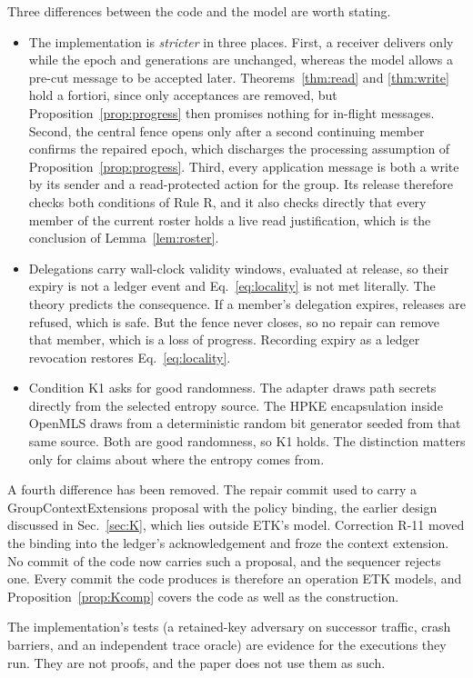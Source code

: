 \documentclass[aps,prx,reprint,superscriptaddress,nofootinbib,floatfix]{revtex4-2}
\theoremstyle{remark}
\begin{document}
Three differences between the code and the model are worth stating.
\begin{itemize}
\item The implementation is \emph{stricter} in three places. First, a receiver delivers only while the epoch and generations are unchanged, whereas the model allows a pre-cut message to be accepted later. Theorems~\ref{thm:read} and \ref{thm:write} hold a fortiori, since only acceptances are removed, but Proposition~\ref{prop:progress} then promises nothing for in-flight messages. Second, the central fence opens only after a second continuing member confirms the repaired epoch, which discharges the processing assumption of Proposition~\ref{prop:progress}. Third, every application message is both a write by its sender and a read-protected action for the group. Its release therefore checks both conditions of Rule R, and it also checks directly that every member of the current roster holds a live read justification, which is the conclusion of Lemma~\ref{lem:roster}.
\item Delegations carry wall-clock validity windows, evaluated at release, so their expiry is not a ledger event and Eq.~\eqref{eq:locality} is not met literally. The theory predicts the consequence. If a member's delegation expires, releases are refused, which is safe. But the fence never closes, so no repair can remove that member, which is a loss of progress. Recording expiry as a ledger revocation restores Eq.~\eqref{eq:locality}.
\item Condition K1 asks for good randomness. The adapter draws path secrets directly from the selected entropy source. The HPKE encapsulation inside OpenMLS draws from a deterministic random bit generator seeded from that same source. Both are good randomness, so K1 holds. The distinction matters only for claims about where the entropy comes from.
\end{itemize}
A fourth difference has been removed. The repair commit used to carry a GroupContextExtensions proposal with the policy binding, the earlier design discussed in Sec.~\ref{sec:K}, which lies outside ETK's model. Correction R-11 moved the binding into the ledger's acknowledgement and froze the context extension. No commit of the code now carries such a proposal, and the sequencer rejects one. Every commit the code produces is therefore an operation ETK models, and Proposition~\ref{prop:Kcomp} covers the code as well as the construction.

The implementation's tests (a retained-key adversary on successor traffic, crash barriers, and an independent trace oracle) are evidence for the executions they run. They are not proofs, and the paper does not use them as such.
\end{document}
